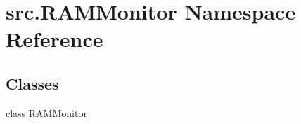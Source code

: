 \hypertarget{namespacesrc_1_1_r_a_m_monitor}{\section{src.\-R\-A\-M\-Monitor Namespace Reference}
\label{namespacesrc_1_1_r_a_m_monitor}
}
\subsection*{Classes}
\begin{DoxyCompactItemize}
\item 
class \hyperlink{classsrc_1_1_r_a_m_monitor_1_1_r_a_m_monitor}{R\-A\-M\-Monitor}
\end{DoxyCompactItemize}
